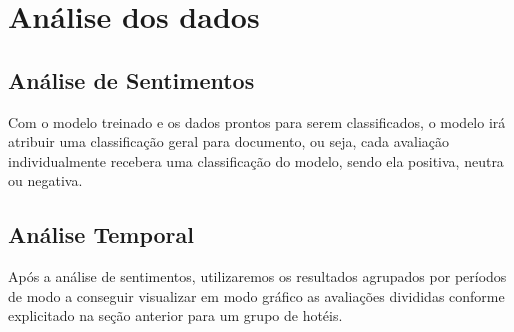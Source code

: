 
\section{Análise dos dados}

\subsection{Análise de Sentimentos}
\label{subsec:analise_sentimentos}

Com o modelo treinado e os dados prontos para serem classificados, o modelo irá atribuir uma classificação geral para documento, ou seja, cada avaliação individualmente recebera uma classificação do modelo, sendo ela positiva, neutra ou negativa.

\subsection{Análise Temporal}
\label{subsec:analise_temporal}
Após a análise de sentimentos, utilizaremos os resultados agrupados por períodos de modo a conseguir visualizar em modo gráfico as avaliações divididas conforme explicitado na seção anterior para um grupo de hotéis.
